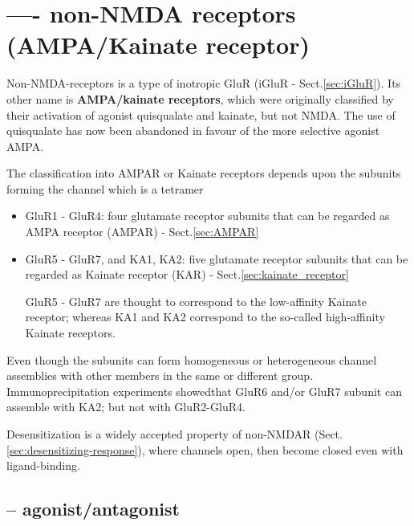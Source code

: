 
\section{---- non-NMDA receptors (AMPA/Kainate receptor)}
\label{sec:AMPA/Kainate-receptor}
\label{sec:non-NMDA-receptor}

Non-NMDA-receptors is a type of inotropic GluR (iGluR - Sect.\ref{sec:iGluR}).
Its other name is {\bf AMPA/kainate receptors}, which were originally classified
by their activation of agonist quisqualate and kainate, but not NMDA.
The use of quisqualate has now been abandoned in favour of the more selective
agonist AMPA.


The classification into AMPAR or Kainate receptors depends upon the subunits
forming the channel which is a tetramer
\begin{itemize}
  \item GluR1 - GluR4: four glutamate receptor subunits that can be regarded as
  AMPA receptor (AMPAR) - Sect.\ref{sec:AMPAR}
  
  \item GluR5 - GluR7, and KA1, KA2: five glutamate receptor subunits that can
  be regarded as Kainate receptor (KAR) - Sect.\ref{sec:kainate_receptor}

GluR5 - GluR7 are thought to correspond to the low-affinity Kainate receptor;
whereas KA1 and KA2 correspond to the so-called high-affinity Kainate receptors.

\end{itemize}
Even though the subunits can form homogeneous or heterogeneous channel
assemblies with other members in the same or different group.
Immunoprecipitation experiments showedthat GluR6 and/or GluR7 subunit can
assemble with KA2; but not with GluR2-GluR4.

Desensitization is a widely accepted property of non-NMDAR
(Sect.\ref{sec:desensitizing-response}), where channels open, then become closed
even with ligand-binding. 

\subsection{-- agonist/antagonist}

